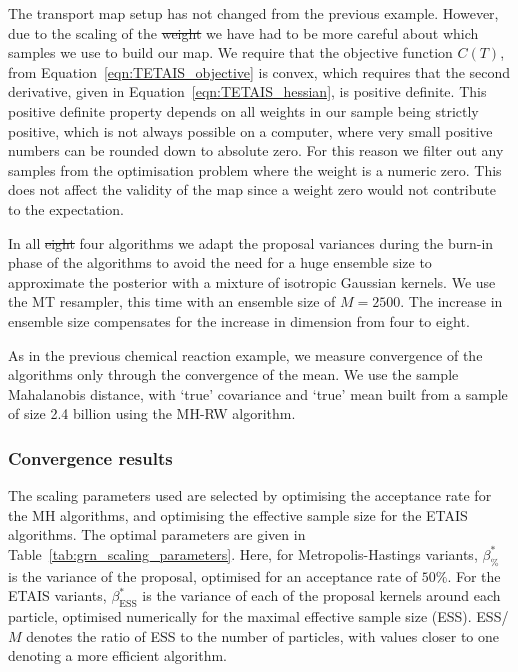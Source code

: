 \documentclass[final]{siamltex}
\newcommand{\edit}[1]{{\color{red} #1}}  %
\providecommand{\DIFadd}[1]{{\protect\color{blue}\uwave{#1}}} %
\providecommand{\DIFdel}[1]{{\protect\color{red}\sout{#1}}}                      %
\providecommand{\DIFaddbegin}{} %
\providecommand{\DIFaddend}{} %
\providecommand{\DIFdelbegin}{} %
\providecommand{\DIFdelend}{} %
\newcommand{\DIFscaledelfig}{0.5}
\newlength{\DIFdelgraphicswidth} %
\newlength{\DIFdelgraphicsheight} %
\newcommand{\DIFaddincludegraphics}[2][]{{\color{blue}\fbox{\DIFOincludegraphics[#1]{#2}}}} %
\newcommand{\DIFdelincludegraphics}[2][]{%
\sbox{\DIFdelgraphicsbox}{\DIFOincludegraphics[#1]{#2}}%
\settoboxwidth{\DIFdelgraphicswidth}{\DIFdelgraphicsbox} %
\settoboxtotalheight{\DIFdelgraphicsheight}{\DIFdelgraphicsbox} %
\scalebox{\DIFscaledelfig}{%
\parbox[b]{\DIFdelgraphicswidth}{\usebox{\DIFdelgraphicsbox}\\[-\baselineskip] \rule{\DIFdelgraphicswidth}{0em}}\llap{\resizebox{\DIFdelgraphicswidth}{\DIFdelgraphicsheight}{%
\setlength{\unitlength}{\DIFdelgraphicswidth}%
\begin{picture}(1,1)%
\thicklines\linethickness{2pt} %
{\color[rgb]{1,0,0}\put(0,0){\framebox(1,1){}}}%
{\color[rgb]{1,0,0}\put(0,0){\line( 1,1){1}}}%
{\color[rgb]{1,0,0}\put(0,1){\line(1,-1){1}}}%
\end{picture}%
}\hspace*{3pt}}} %
} %
\DeclareRobustCommand{\DIFaddbegin}{\DIFOaddbegin \let\includegraphics\DIFaddincludegraphics} %
\DeclareRobustCommand{\DIFaddend}{\DIFOaddend \let\includegraphics\DIFOincludegraphics} %
\DeclareRobustCommand{\DIFdelbegin}{\DIFOdelbegin \let\includegraphics\DIFdelincludegraphics} %
\DeclareRobustCommand{\DIFdelend}{\DIFOaddend \let\includegraphics\DIFOincludegraphics} %
\begin{document}
The transport map setup has not changed from the previous
example. However, due to the scaling of the \DIFdelbegin \DIFdel{weight }\DIFdelend \DIFaddbegin \DIFadd{weights }\DIFaddend we have had to be
more careful about which samples we use to build our map. We require
that the objective function $C(T)$, from
Equation~\eqref{eqn:TETAIS_objective} is convex, which requires that
the second derivative, given in Equation~\eqref{eqn:TETAIS_hessian},
is positive definite. This positive definite property depends on all
weights in our sample being strictly positive, which is not always
possible on a computer, where very small positive numbers can be
rounded down to absolute zero. For this reason we filter out any samples from the optimisation problem where the weight is a numeric zero. This does not affect the validity of the map since a weight zero would not contribute to the expectation.

In all \DIFdelbegin \DIFdel{eight }\DIFdelend \DIFaddbegin \edit{four} \DIFaddend algorithms we adapt the proposal variances during the
burn-in phase of the algorithms to avoid the need for a huge ensemble size to approximate the posterior with a mixture of isotropic Gaussian kernels.
We use the MT resampler, this time with an ensemble size of $M=2500$. The increase in ensemble size compensates for the increase in dimension from four to eight.

As in the previous chemical reaction example, we measure convergence of the algorithms only through the convergence of the mean. We use the sample Mahalanobis distance, with `true' covariance and `true' mean built from a sample of size 2.4 billion using the MH-RW algorithm.

\subsubsection{Convergence results}

The scaling parameters used are selected by optimising the acceptance
rate for the MH algorithms, and optimising the effective sample size
for the ETAIS algorithms. The optimal parameters are given in
Table~\ref{tab:grn_scaling_parameters}. Here, for Metropolis-Hastings
variants, $\beta_{\%}^*$ is the variance of the proposal, optimised
for an acceptance rate of $50\%$. For the ETAIS variants,
$\beta_{\text{ESS}}^*$ is the variance of each of the proposal kernels
around each particle, optimised numerically for the maximal effective
sample size (ESS). ESS/$M$ denotes the ratio of ESS to the number of
particles, with values closer to one denoting a more efficient algorithm.
\end{document}
